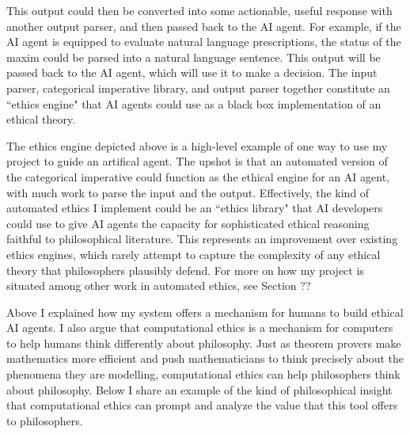 \begin{isabellebody}
\begin{isamarkuptext}
This output could then be converted into some actionable, useful response with another output parser, 
and then passed back to the AI agent. For example, if the AI agent is equipped to evaluate natural language prescriptions, the 
status of the maxim could be parsed into a natural language sentence. This output will be passed back 
to the AI agent, which will use it to make a decision. The input parser, categorical imperative library, 
and output parser together constitute an ``ethics engine" that AI agents could use as a black box 
implementation of an ethical theory. 

The ethics engine depicted above is a high-level example of one way to use my project to guide an artifical agent. The 
upshot is that an automated version of the categorical imperative could function as the ethical engine 
for an AI agent, with much work to parse the input and the output. Effectively, the kind 
of automated ethics I implement could be 
an ``ethics library" that AI developers could use to give AI agents the capacity for 
sophisticated ethical reasoning faithful to philosophical literature. This represents an improvement 
over existing ethics engines, which rarely attempt to capture the complexity 
of any ethical theory that philosophers plausibly defend. For more on how my project is situated 
among other work in automated ethics, see Section ??%
\end{isamarkuptext}\isamarkuptrue%
%
\isadelimdocument
%
\endisadelimdocument
%
\isatagdocument
%
\isamarkuptrue%
%
\endisatagdocument
{\isafolddocument}%
%
\isadelimdocument
%
\endisadelimdocument
%
\begin{isamarkuptext}%
Above I explained how my system offers a mechanism for humans to build ethical AI agents. I also 
argue that computational ethics is a mechanism for computers to help humans think differently about 
philosophy. Just as theorem provers make mathematics more efficient and push mathematicians to think 
precisely about the phenomena they are modelling, computational ethics can help philosophers think about 
philosophy. Below I share an example of the kind of philosophical insight that computational ethics 
can prompt and analyze the value that this tool offers to philosophers.%
\end{isamarkuptext}\isamarkuptrue%
%
\isadelimdocument
%
\endisadelimdocument
%
\isatagdocument
%
\isamarkuptrue%
%
\endisatagdocument
{\isafolddocument}%
%
\isadelimdocument

\end{isabellebody}
